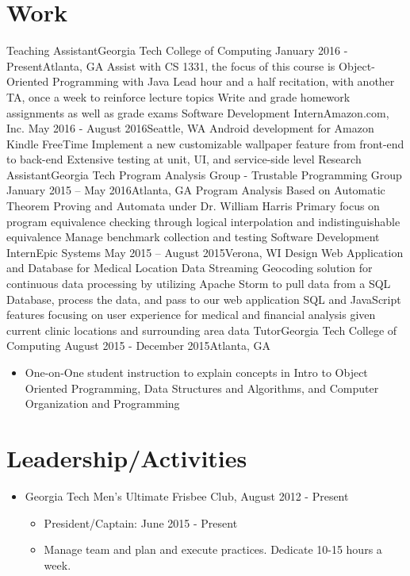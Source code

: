 \documentclass{resume_template}
\begin{document}
	\section{Work}
		\noindent\workinfo
			{Teaching Assistant}{Georgia Tech College of Computing}
			{January 2016 - Present}{Atlanta, GA}
		\workitems
			{Assist with CS 1331, the focus of this course is Object-Oriented Programming with Java}
			{Lead hour and a half recitation, with another TA, once a week to reinforce lecture topics}
			{Write and grade homework assignments as well as grade exams}
		\workinfo
			{Software Development Intern}{Amazon.com, Inc.}
			{May 2016 - August 2016}{Seattle, WA}
    	\workitems
		{Android development for Amazon Kindle FreeTime}
		{Implement a new customizable wallpaper feature from front-end to back-end}
		{Extensive testing at unit, UI, and service-side level}
		\workinfo
		{Research Assistant}{Georgia Tech Program Analysis Group - Trustable Programming Group}
		{January 2015 – May 2016}{Atlanta, GA}
		\workitems
		{Program Analysis Based on Automatic Theorem Proving and Automata under Dr. William Harris}
		{Primary focus on program equivalence checking through logical interpolation and indistinguishable equivalence}
		{Manage benchmark collection and testing}
		\workinfo
			{Software Development Intern}{Epic Systems}
			{May 2015 – August 2015}{Verona, WI}
		\workitems
			{Design Web Application and Database for Medical Location Data}
			{Streaming Geocoding solution for continuous data processing by utilizing Apache Storm to pull data from a SQL
				Database, process the data, and pass to our web application}
			{SQL and JavaScript features focusing on user experience for medical and financial analysis given current clinic
				locations and surrounding area data}
		\workinfo
			{Tutor}{Georgia Tech College of Computing}
			{August 2015 - December 2015}{Atlanta, GA}
		\begin{itemize}[leftmargin=0.4cm]
		\item One-on-One student instruction to explain concepts in Intro to Object Oriented Programming, Data Structures and
			Algorithms, and Computer Organization and Programming	
		\end{itemize}
	\section{Leadership/Activities}
		
	\begin{itemize}[nosep, leftmargin=0.4cm]
	\item Georgia Tech Men's Ultimate Frisbee Club, August 2012 - Present
		\begin{itemize}[nosep]
		\item[] President/Captain: June 2015 - Present
		\item[] Manage team and plan and execute practices. Dedicate 10-15 hours a week.
		\end{itemize}
	\end{itemize}
\end{document}

